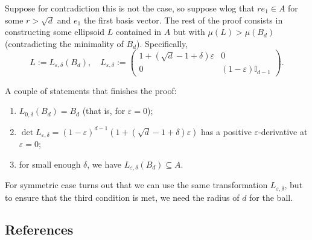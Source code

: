 \documentclass{template-2}
\begin{document}
Suppose for contradiction this is not the case, so suppose wlog that $re_1 \in
A$ for some $r>\sqrt{d}$ and $e_1$ the first basis vector. The rest of the proof
consists in constructing some ellipsoid $L$ contained in $A$ but with
$\mu(L)>\mu(B_d)$ (contradicting the minimality of $B_d$). Specifically,
\begin{equation*}
    L := L_{\varepsilon,\delta}(B_d), \quad L_{\varepsilon,\delta} := \begin{pmatrix}
        1+(\sqrt{d}-1+\delta)\varepsilon & 0 \\
        0 & (1-\varepsilon)\mathbb{I}_{d-1}
    \end{pmatrix}.
\end{equation*}

A couple of statements that finishes the proof:
\begin{enumerate}
    \item $L_{0,\delta}(B_d)=B_d$ (that is, for $\varepsilon=0$);
    \item $\det
    L_{\varepsilon,\delta}=(1-\varepsilon)^{d-1}(1+(\sqrt{d}-1+\delta)\varepsilon)$
    has a positive $\varepsilon$-derivative at $\varepsilon=0$;
    \item for small enough $\delta$, we have $L_{\varepsilon,\delta}(B_d) \subseteq A$.
\end{enumerate}

For symmetric case turns out that we can use the same transformation
$L_{\varepsilon,\delta}$, but to ensure that the third condition is met, 
we need the radius of $d$ for the ball.

\subsection*{References}
\footnotesize
\renewcommand{\refname}{\vspace{-1em}}


\end{document}
